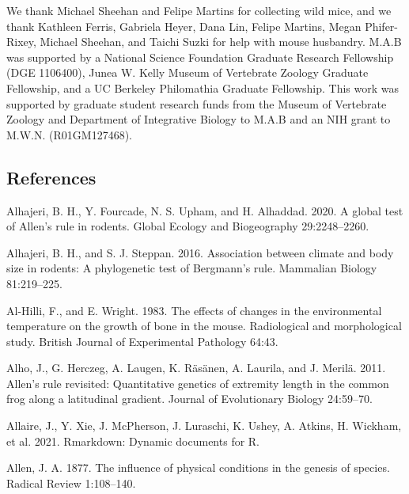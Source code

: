 \documentclass[]{article}
\begin{document}
\noindent We thank Michael Sheehan and Felipe Martins for collecting
wild mice, and we thank Kathleen Ferris, Gabriela Heyer, Dana Lin,
Felipe Martins, Megan Phifer-Rixey, Michael Sheehan, and Taichi Suzki
for help with mouse husbandry. M.A.B was supported by a National Science
Foundation Graduate Research Fellowship (DGE 1106400), Junea W. Kelly
Museum of Vertebrate Zoology Graduate Fellowship, and a UC Berkeley
Philomathia Graduate Fellowship. This work was supported by graduate
student research funds from the Museum of Vertebrate Zoology and
Department of Integrative Biology to M.A.B and an NIH grant to M.W.N.
(R01GM127468).

\vspace{5mm}

\hypertarget{references}{%
\subsection{References}\label{references}}

\setlength{\parindent}{-0.25in}
\setlength{\leftskip}{0.25in}

\noindent

\hypertarget{refs}{}
\leavevmode\hypertarget{ref-Alhajeri2020}{}%
Alhajeri, B. H., Y. Fourcade, N. S. Upham, and H. Alhaddad. 2020. A
global test of Allen's rule in rodents. Global Ecology and Biogeography
29:2248--2260.

\leavevmode\hypertarget{ref-Alhajeri2016}{}%
Alhajeri, B. H., and S. J. Steppan. 2016. Association between climate
and body size in rodents: A phylogenetic test of Bergmann's rule.
Mammalian Biology 81:219--225.

\leavevmode\hypertarget{ref-Al-Hilli1983}{}%
Al-Hilli, F., and E. Wright. 1983. The effects of changes in the
environmental temperature on the growth of bone in the mouse.
Radiological and morphological study. British Journal of Experimental
Pathology 64:43.

\leavevmode\hypertarget{ref-Alho2011}{}%
Alho, J., G. Herczeg, A. Laugen, K. Räsänen, A. Laurila, and J. Merilä.
2011. Allen's rule revisited: Quantitative genetics of extremity length
in the common frog along a latitudinal gradient. Journal of Evolutionary
Biology 24:59--70.

\leavevmode\hypertarget{ref-Allaire2021}{}%
Allaire, J., Y. Xie, J. McPherson, J. Luraschi, K. Ushey, A. Atkins, H.
Wickham, et al. 2021. Rmarkdown: Dynamic documents for R.

\leavevmode\hypertarget{ref-Allen1877}{}%
Allen, J. A. 1877. The influence of physical conditions in the genesis
of species. Radical Review 1:108--140.
\end{document}
